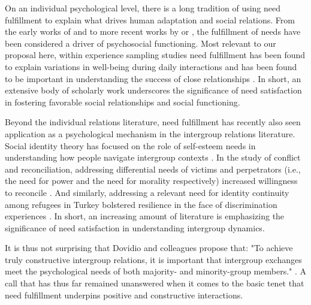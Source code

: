 \documentclass[man, 12pt, a4paper, mask]{apa7}
\theoremstyle{break}
\theoremstyle{plain}
\begin{document}
On an individual psychological level, there is a long tradition of using need fulfillment to explain what drives human adaptation and social relations. From the early works of \citet[][]{maslow1943} and \citet[][]{lewin1926e} to more recent works by \citet[][]{Ryan2017} or \citet[][]{Steverink2006}, the fulfillment of needs have been considered a driver of psychosocial functioning. Most relevant to our proposal here, within experience sampling studies need fulfillment has been found to explain variations in well-being during daily interactions \citep[][]{Downie2008} and has been found to be important in understanding the success of close relationships \citep[e.g., see][]{knee2023}. In short, an extensive body of scholarly work underscores the significance of need satisfaction in fostering favorable social relationships and social functioning.

Beyond the individual relations literature, need fulfillment has recently also seen application as a psychological mechanism in the intergroup relations literature. Social identity theory has focused on the role of self-esteem needs in understanding how people navigate intergroup contexts \citep[e.g.,][]{abrams1988}. In the study of conflict and reconciliation, addressing differential needs of victims and perpetrators (i.e., the need for power and the need for morality respectively) increased willingness to reconcile \citep[][]{Shnabel2008}. And similarly, addressing a relevant need for identity continuity among refugees in Turkey bolstered resilience in the face of discrimination experiences \citep[][]{Celebi2017}. In short, an increasing amount of literature is emphasizing the significance of need satisfaction in understanding intergroup dynamics.

It is thus not surprising that Dovidio and colleagues propose that: "To achieve truly constructive intergroup relations, it is important that intergroup exchanges meet the psychological needs of both majority- and minority-group members." \citep[][p. 6]{Dovidio2017}. A call that has thus far remained unanswered when it comes to the basic tenet that need fulfillment underpins positive and constructive interactions.
\end{document}
